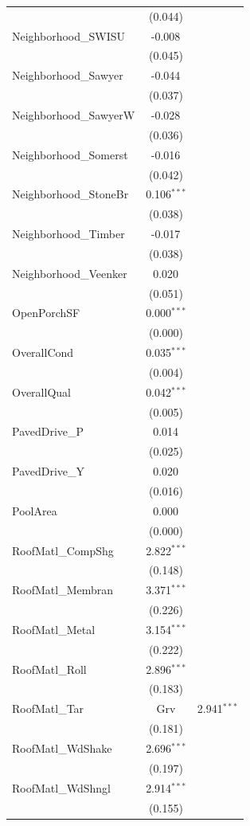 \begin{table}[!htbp]
\begin{tabular}{@{\extracolsep{5pt}}lc}
& (0.044) \\
 Neighborhood_SWISU & -0.008$^{}$ \\
& (0.045) \\
 Neighborhood_Sawyer & -0.044$^{}$ \\
& (0.037) \\
 Neighborhood_SawyerW & -0.028$^{}$ \\
& (0.036) \\
 Neighborhood_Somerst & -0.016$^{}$ \\
& (0.042) \\
 Neighborhood_StoneBr & 0.106$^{***}$ \\
& (0.038) \\
 Neighborhood_Timber & -0.017$^{}$ \\
& (0.038) \\
 Neighborhood_Veenker & 0.020$^{}$ \\
& (0.051) \\
 OpenPorchSF & 0.000$^{***}$ \\
& (0.000) \\
 OverallCond & 0.035$^{***}$ \\
& (0.004) \\
 OverallQual & 0.042$^{***}$ \\
& (0.005) \\
 PavedDrive_P & 0.014$^{}$ \\
& (0.025) \\
 PavedDrive_Y & 0.020$^{}$ \\
& (0.016) \\
 PoolArea & 0.000$^{}$ \\
& (0.000) \\
 RoofMatl_CompShg & 2.822$^{***}$ \\
& (0.148) \\
 RoofMatl_Membran & 3.371$^{***}$ \\
& (0.226) \\
 RoofMatl_Metal & 3.154$^{***}$ \\
& (0.222) \\
 RoofMatl_Roll & 2.896$^{***}$ \\
& (0.183) \\
 RoofMatl_Tar&Grv & 2.941$^{***}$ \\
& (0.181) \\
 RoofMatl_WdShake & 2.696$^{***}$ \\
& (0.197) \\
 RoofMatl_WdShngl & 2.914$^{***}$ \\
& (0.155) \\

\end{tabular}
\end{table}
